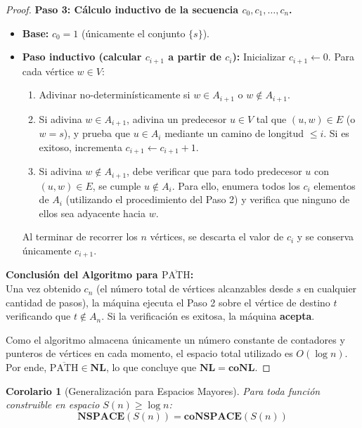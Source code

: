 \documentclass[11pt, a4paper]{article}
\theoremstyle{definition}
\theoremstyle{plain}
\newtheorem{corolario}[definicion]{Corolario}
\theoremstyle{remark}
\newcommand{\classNL}{\mathbf{NL}}
\newcommand{\classcoNL}{\mathbf{coNL}}
\newcommand{\NSPACE}{\mathbf{NSPACE}}
\newcommand{\coPATH}{\overline{\text{PATH}}}
\begin{document}
\begin{proof}
\vspace{0.5em}
\noindent\textbf{Paso 3: Cálculo inductivo de la secuencia $c_0, c_1, \dots, c_n$.}
\begin{itemize}
    \item \textbf{Base:} $c_0 = 1$ (únicamente el conjunto $\{s\}$).
    \item \textbf{Paso inductivo (calcular $c_{i+1}$ a partir de $c_i$):}
    Inicializar $c_{i+1} \leftarrow 0$. Para cada vértice $w \in V$:
    \begin{enumerate}[label=\arabic*.]
        \item Adivinar no-determinísticamente si $w \in A_{i+1}$ o $w \notin A_{i+1}$.
        \item Si adivina $w \in A_{i+1}$, adivina un predecesor $u \in V$ tal que $(u, w) \in E$ (o $w = s$), y prueba que $u \in A_i$ mediante un camino de longitud $\le i$. Si es exitoso, incrementa $c_{i+1} \leftarrow c_{i+1} + 1$.
        \item Si adivina $w \notin A_{i+1}$, debe verificar que para todo predecesor $u$ con $(u, w) \in E$, se cumple $u \notin A_i$. Para ello, enumera todos los $c_i$ elementos de $A_i$ (utilizando el procedimiento del Paso 2) y verifica que ninguno de ellos sea adyacente hacia $w$.
    \end{enumerate}
    Al terminar de recorrer los $n$ vértices, se descarta el valor de $c_i$ y se conserva únicamente $c_{i+1}$.
\end{itemize}

\vspace{0.5em}
\noindent\textbf{Conclusión del Algoritmo para $\coPATH$:}\\
Una vez obtenido $c_n$ (el número total de vértices alcanzables desde $s$ en cualquier cantidad de pasos), la máquina ejecuta el Paso 2 sobre el vértice de destino $t$ verificando que $t \notin A_n$. Si la verificación es exitosa, la máquina \textbf{acepta}.

Como el algoritmo almacena únicamente un número constante de contadores y punteros de vértices en cada momento, el espacio total utilizado es $O(\log n)$. Por ende, $\coPATH \in \classNL$, lo que concluye que $\classNL = \classcoNL$.
\end{proof}

\begin{corolario}[Generalización para Espacios Mayores]
Para toda función construible en espacio $S(n) \ge \log n$:
\[
\NSPACE(S(n)) = \mathbf{coNSPACE}(S(n))
\]
\end{corolario}
\end{document}
